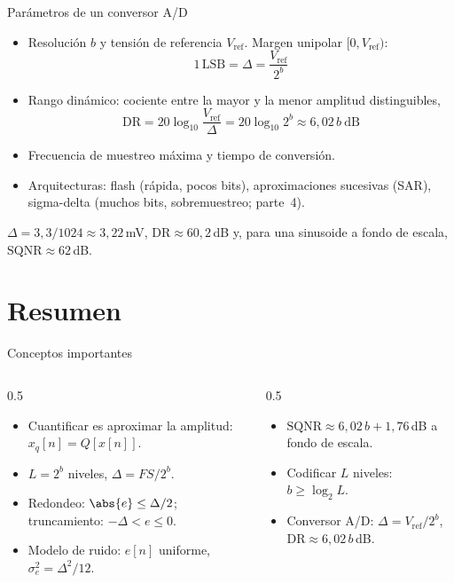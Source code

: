 \documentclass[aspectratio=169,11pt]{beamer}
\begin{document}
\begin{frame}{Parámetros de un conversor A/D}
  \begin{itemize}
    \item \alert{Resolución} $b$ y \alert{tensión de referencia} $V_{\text{ref}}$. Margen unipolar $[0,V_{\text{ref}})$:
    \[
      1\,\text{LSB}=\Delta=\frac{V_{\text{ref}}}{2^b}
    \]
    \item \alert{Rango dinámico}: cociente entre la mayor y la menor amplitud distinguibles,
    \[
      \mathrm{DR}=20\log_{10}\frac{V_{\text{ref}}}{\Delta}=20\log_{10}2^b\approx6{,}02\,b\ \text{dB}
    \]
    \item \alert{Frecuencia de muestreo} máxima y tiempo de conversión.
    \item Arquitecturas: flash (rápida, pocos bits), aproximaciones sucesivas (SAR), sigma-delta (muchos bits, sobremuestreo; parte~4).
  \end{itemize}
  \begin{ejemplo}[Microcontrolador con A/D de 10 bits y $V_{\text{ref}}=3{,}3$\,V]
    $\Delta=3{,}3/1024\approx3{,}22$\,mV, $\mathrm{DR}\approx60{,}2$\,dB y, para una sinusoide a fondo de escala, $\mathrm{SQNR}\approx62$\,dB.
  \end{ejemplo}
\end{frame}

\section*{Resumen}
\begin{frame}{Conceptos importantes}
  \begin{columns}[T]
    \begin{column}{0.5\textwidth}
      \begin{itemize}
        \item Cuantificar es aproximar la amplitud: $x_q[n]=Q[x[n]]$.
        \item $L=2^b$ niveles, $\Delta=FS/2^b$.
        \item Redondeo: $\abs{e}\le\Delta/2$; truncamiento: $-\Delta<e\le0$.
        \item Modelo de ruido: $e[n]$ uniforme, $\sigma_e^2=\Delta^2/12$.
      \end{itemize}
    \end{column}
    \begin{column}{0.5\textwidth}
      \begin{itemize}
        \item $\mathrm{SQNR}\approx6{,}02\,b+1{,}76$\,dB a fondo de escala.
        \item Codificar $L$ niveles: $b\ge\log_2L$.
        \item Conversor A/D: $\Delta=V_{\text{ref}}/2^b$, $\mathrm{DR}\approx6{,}02\,b$\,dB.
      \end{itemize}
    \end{column}
  \end{columns}
  \bigskip
\end{frame}
\end{document}
